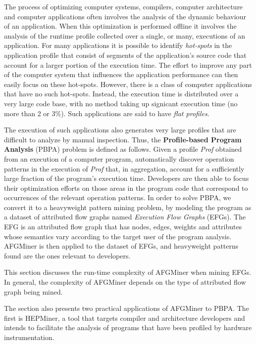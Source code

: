 The process of optimizing computer systems, compilers, computer architecture and computer applications often involves the analysis of the dynamic behaviour of an application. When this optimization is performed offline it involves the analysis of the runtime profile collected over a single, or many, executions of an application. For many applications it is possible to identify {\em hot-spots} in the application profile that consist of segments of the application's source code that account for a larger portion of the execution time. The effort to improve any part of the computer system that influences the application performance can then easily focus on these hot-spots. However, there is a class of computer applications that have no such hot-spots. Instead, the execution time is distributed over a very large code base, with no method taking up signicant execution time (\ie no more than 2 or 3\%). Such applications are said to have \emph{flat profiles}.

The execution of such applications also generates very large profiles that are difficult to analyze by manual inspection. Thus, the {\bf Profile-based Program Analysis} (PBPA) problem is defined as follows. Given a profile {\em Prof} obtained from an execution of a computer program, automatically discover operation patterns in the execution of {\em Prof} that, in aggregation, account for a sufficiently large fraction of the program's execution time. Developers are then able to focus their optimization efforts on those areas in the program code that correspond to occurrences of the relevant operation patterns. In order to solve PBPA, we convert it to a heavyweight pattern mining problem, by modeling the program as a dataset of attributed flow graphs named \emph{Execution Flow Graphs} (EFGs). The EFG is an attributed flow graph that has nodes, edges, weights and attributes whose semantics vary according to the target user of the program analysis. AFGMiner is then applied to the dataset of EFGs, and heavyweight patterns found are the ones relevant to developers. 

This section discusses the run-time complexity of AFGMiner when mining EFGs. In general, the complexity of AFGMiner depends on the type of attributed flow graph being mined.

The section also presents two practical applications of AFGMiner to PBPA. The first is HEPMiner, a tool that targets compiler and architecture developers and intends to facilitate the analysis of programs that have been profiled by hardware instrumentation\cite{Nagpurkar-caecw07}. 


